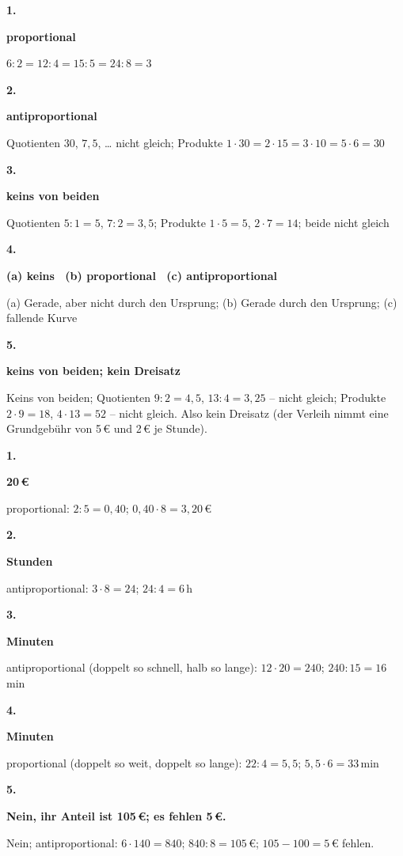 \documentclass[11pt]{article}
\newcommand{\lsg}[3]{\par\noindent\begin{minipage}[t]{9mm}\textbf{#1}\end{minipage}%
  \begin{minipage}[t]{52mm}\raggedright\bfseries\boldmath #2\end{minipage}\hspace{3mm}%
  \begin{minipage}[t]{\dimexpr\linewidth-64mm\relax}\raggedright\small #3\end{minipage}\par\vspace{4pt}}
\begin{document}
\par\smallskip
{}\par
\par\Needspace{25mm}\vspace{6pt}\noindent\colorbox{black!12}{}\hspace{2mm}{\bfseries Tabelle und Graph prüfen}\par\vspace{4pt}
\lsg{1.}{proportional}{$6 : 2 = 12 : 4 = 15 : 5 = 24 : 8 = 3$}
\lsg{2.}{antiproportional}{Quotienten $30$, $7{,}5$, … nicht gleich; Produkte $1 \cdot 30 = 2 \cdot 15 = 3 \cdot 10 = 5 \cdot 6 = 30$}
\lsg{3.}{keins von beiden}{Quotienten $5 : 1 = 5$, $7 : 2 = 3{,}5$; Produkte $1 \cdot 5 = 5$, $2 \cdot 7 = 14$; beide nicht gleich}
\lsg{4.}{(a) keins \ (b) proportional \ (c) antiproportional}{(a) Gerade, aber nicht durch den Ursprung; (b) Gerade durch den Ursprung; (c) fallende Kurve}
\lsg{5.}{keins von beiden; kein Dreisatz}{Keins von beiden; Quotienten $9 : 2 = 4{,}5$, $13 : 4 = 3{,}25$ – nicht gleich; Produkte $2 \cdot 9 = 18$, $4 \cdot 13 = 52$ – nicht gleich. Also kein Dreisatz (der Verleih nimmt eine Grundgebühr von 5\,€ und 2\,€ je Stunde).}
\par\Needspace{25mm}\vspace{6pt}\noindent\colorbox{black!12}{}\hspace{2mm}{\bfseries Am Text erkennen, dann rechnen}\par\vspace{4pt}
\lsg{1.}{3{,}20\,€}{proportional: $2 : 5 = 0{,}40$; $0{,}40 \cdot 8 = 3{,}20$\,€}
\lsg{2.}{6 Stunden}{antiproportional: $3 \cdot 8 = 24$; $24 : 4 = 6$\,h}
\lsg{3.}{16 Minuten}{antiproportional (doppelt so schnell, halb so lange): $12 \cdot 20 = 240$; $240 : 15 = 16$\,min}
\lsg{4.}{33 Minuten}{proportional (doppelt so weit, doppelt so lange): $22 : 4 = 5{,}5$; $5{,}5 \cdot 6 = 33$\,min}
\lsg{5.}{Nein, ihr Anteil ist 105\,€; es fehlen 5\,€.}{Nein; antiproportional: $6 \cdot 140 = 840$; $840 : 8 = 105$\,€; $105 - 100 = 5$\,€ fehlen.}
\par\Needspace{25mm}\vspace{6pt}\noindent\colorbox{black!12}{}\hspace{2mm}{\bfseries Mit der Rate rechnen: Kosten, Tempo, Dauer}\par\vspace{4pt}
\end{document}
